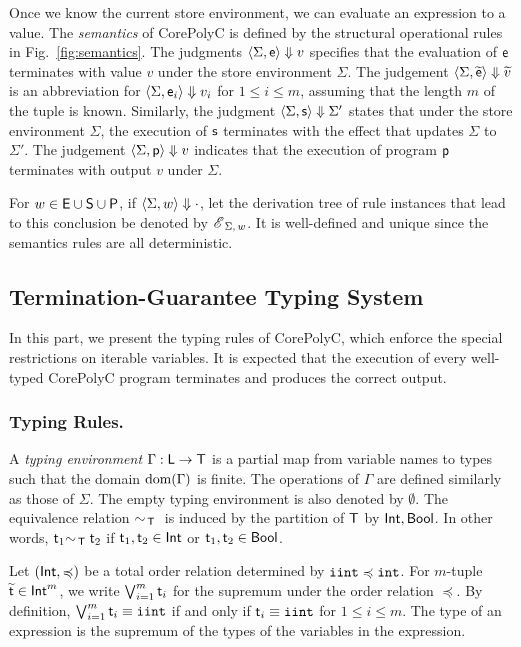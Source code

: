 \documentclass[runningheads]{llncs}
\begin{document}
Once we know the current store environment, we can evaluate an expression to a value.
The \emph{semantics} of CorePolyC is defined by the structural operational rules in Fig.~\ref{fig:semantics}.
The judgments $\semantics{\Sigma}{\e}{v}$ specifies that the evaluation of $\e$ terminates with value $v$ under the store environment $\Sigma$.
The judgement $\semantics{\Sigma}{\widetilde{\e}}{\widetilde{v}}$ is an abbreviation for $\semantics{\Sigma}{\e_i}{v_i}$ for $1 \leq i \leq m$, assuming that the length $m$ of the tuple is known.
Similarly, the judgment $\semantics{\Sigma}{\s}{\Sigma'}$ states that under the store environment $\Sigma$, the execution of $\s$ terminates with the effect that updates $\Sigma$ to $\Sigma'$.
The judgement $\semantics{\Sigma}{\p}{v}$ indicates that the execution of program $\p$ terminates with output $v$ under $\Sigma$.

For $w\in\E\cup\S\cup\P$, if $\semantics{\Sigma}{w}{\cdot}$, let the derivation tree of rule instances that lead to this conclusion be denoted by $\evalTree{\Sigma}{w}$.
It is well-defined and unique since the semantics rules are all deterministic.

\subsection{Termination-Guarantee Typing System}
\label{sec:semantics}

In this part, we present the typing rules of CorePolyC, which enforce the special restrictions on iterable variables.
It is expected that the execution of every well-typed CorePolyC program terminates and produces the correct output.

\subsubsection{Typing Rules.}
A \textit{typing environment} $\Gamma:\L\to\T$ is a partial map from variable names to types such that the domain $\dom(\Gamma)$ is finite.
The operations of $\Gamma$ are defined similarly as those of $\Sigma$.
The empty typing environment is also denoted by $\emptyset$.
The equivalence relation $\comparable$ is induced by the partition of $\T$ by $\Int,\Bool$.
In other words, $\tt_1 \comparable \tt_2$ if $\tt_1,\tt_2\in\Int$ or $\tt_1,\tt_2\in\Bool$.

Let $(\Int, \preccurlyeq)$ be a total order relation determined by $\typeIterInt\preccurlyeq\typeInt$.
For $m$-tuple $\widetilde{\tt}\in\Int^m$,  we write $\bigvee_{i=1}^m \tt_i$ for the supremum under the order relation $\preccurlyeq$.
By definition, $\bigvee_{i=1}^m \tt_i\equiv\typeIterInt$ if and only if $\tt_i\equiv\typeIterInt$ for $1\le i\le m$.
The type of an expression is the supremum of the types of the variables in the expression.
\end{document}
